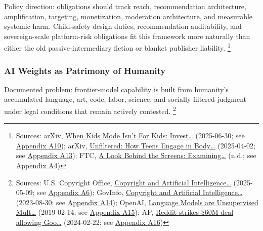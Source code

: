 \documentclass[
  american,
  11pt,
  letterpaper,
]{article}
\begin{document}
Policy direction: obligations should track reach, recommendation
architecture, amplification, targeting, monetization, moderation
architecture, and measurable systemic harm. Child-safety design duties,
recommendation auditability, and sovereign-scale platform-risk
obligations fit this framework more naturally than either the old
passive-intermediary fiction or blanket publisher liability. \footnote{Sources:
  arXiv, \href{https://arxiv.org/abs/2507.00299}{When Kids Mode Isn't
  For Kids: Invest\ldots{}} (2025-06-30; see
  \hyperref[appendix-a10-when-kids-mode-isn-t-for-kids-investigating-tiktok-s-under-13-experience]{Appendix
  A10}); arXiv, \href{https://arxiv.org/abs/2504.02176}{Unfiltered: How
  Teens Engage in Body\ldots{}} (2025-04-02; see
  \hyperref[appendix-a13-unfiltered-how-teens-engage-in-body-image-and-shaming-discussions-via-instagram-direct-messages-dms]{Appendix
  A13}); FTC,
  \href{https://www.ftc.gov/reports/look-behind-screens-examining-data-practices-social-media-video-streaming-services}{A
  Look Behind the Screens: Examining\ldots{}} (n.d.; see
  \hyperref[appendix-a4-a-look-behind-the-screens-examining-the-data-practices-of-social-media-and-video-streaming-services]{Appendix
  A4})}

\subsubsection{AI Weights as Patrimony of
Humanity}\label{ai-weights-as-patrimony-of-humanity}

Documented problem: frontier-model capability is built from humanity's
accumulated language, art, code, labor, science, and socially filtered
judgment under legal conditions that remain actively contested.
\footnote{Sources: U.S. Copyright Office,
  \href{https://copyright.gov/ai/Copyright-and-Artificial-Intelligence-Part-3-Generative-AI-Training-Report-Pre-Publication-Version.pdf}{Copyright
  and Artificial Intelligence\ldots{}} (2025-05-09; see
  \hyperref[appendix-a6-copyright-and-artificial-intelligence-part-3-generative-ai-training-pre-publication-version]{Appendix
  A6}); GovInfo,
  \href{https://www.govinfo.gov/content/pkg/FR-2023-08-30/pdf/2023-18624.pdf}{Copyright
  and Artificial Intelligence\ldots{}} (2023-08-30; see
  \hyperref[appendix-a14-copyright-and-artificial-intelligence-notice-of-inquiry]{Appendix
  A14}); OpenAI,
  \href{https://cdn.openai.com/better-language-models/language_models_are_unsupervised_multitask_learners.pdf}{Language
  Models are Unsupervised Mult\ldots{}} (2019-02-14; see
  \hyperref[appendix-a15-language-models-are-unsupervised-multitask-learners]{Appendix
  A15}); AP,
  \href{https://apnews.com/article/a7f131c7cb4225307134ef21d3c6a708}{Reddit
  strikes \$60M deal allowing Goo\ldots{}} (2024-02-22; see
  \hyperref[appendix-a16-reddit-strikes-60m-deal-allowing-google-to-train-ai-models-on-its-posts-unveils-ipo-plans]{Appendix
  A16})}
\end{document}
